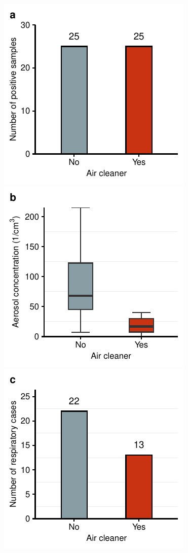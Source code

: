 \documentclass[fleqn,11pt]{wlscirep}
\begin{document}
\begin{figure}[!htpb]
\centering
    \includegraphics{../../results/mol-data/saliva-by-study-condition.pdf}\hspace{1.5cm}
    \includegraphics{../../results/env-data/aerosol-number-boxplot.pdf}
    \includegraphics{../../results/epi-data/cases_by_condition.pdf}\hspace{1.5cm}

\end{figure}
\end{document}
